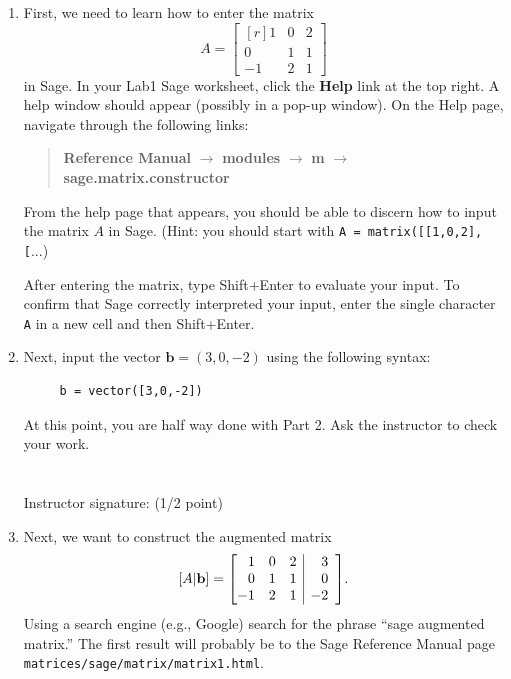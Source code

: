 \documentclass[fleqn,11pt]{paper}
\makeatletter
\theoremstyle{remark}
\renewcommand{\vec}[1]{\mathbf{#1}}
\newcommand{\<}{\ensuremath{\langle}}
\renewcommand{\>}{\ensuremath{\rangle}}
\newcommand\vb{\vec{b}}
\newenvironment{amatrix}[1]{%
  \left[\begin{array}{@{}*{#1}{r}|rr@{}}
}{%
  \end{array}\right]
}
\makeatother
\begin{document}
  \begin{enumerate}
  \item First, we need to learn how to enter the matrix
    \[
    A = \begin{bmatrix*}[r] 1 &0&2\\ 0&1&1\\-1&2&1\end{bmatrix*} %
      \]
      in Sage.
      In your Lab1 Sage worksheet, click the {\bf Help} link at the top right.  A help
    window should appear (possibly in a pop-up window). On the Help page, navigate through the following links: 
    \begin{quote}
    {\bf Reference Manual} $\rightarrow$ {\bf modules} $\rightarrow$ {\bf m} $\rightarrow$ {\bf sage.matrix.constructor}
    \end{quote}
    From the help page that appears, you should be able to discern how to input the matrix $A$ in
    Sage. (Hint: you should start with {\tt A = matrix([[1,0,2],[}...)

    After entering the matrix, type Shift+Enter to evaluate your input.  
    To confirm that Sage correctly interpreted your
    input, enter the single character {\tt A} in a new cell and then Shift+Enter.
  \item Next, input the vector $\vb = (3, 0, -2)$ using the following syntax:
    \begin{verbatim}
     b = vector([3,0,-2])
    \end{verbatim}
    At this point, you are half way done with Part 2.  Ask the instructor to check your work.\\
    \\\\
    Instructor signature: \underline{\phantom{XXXXXXXXXXXXXXXXXXXXXXXXXXXXXXXX}} (1/2 point)
\newpage


  \item Next, we want to construct the augmented matrix 
    \[
      [A|\vb] = 
      \begin{amatrix}{3} 
        1 &0&2&3\\ 0&1&1&0\\-1&2&1&-2
      \end{amatrix}.
      \]
      Using a search engine (e.g., Google) search for the phrase ``sage augmented matrix.''  The
      first result will probably be to the Sage Reference Manual page
      {\tt matrices/sage/matrix/matrix1.html}.  


\end{enumerate}
\end{document}
